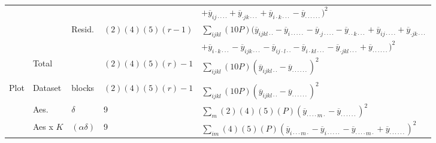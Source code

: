\begin{table}[h]
\begin{tabular}{lllll}
      &&&&\hphantom{$\sum_{ijk} (r)(10P)($}$ + 
                             \overline{y}_{ij\cdot\cdot\cdot\cdot} +
                             \overline{y}_{\cdot jk\cdot\cdot\cdot} + 
                             \overline{y}_{i\cdot k\cdot\cdot\cdot}- 
                             \overline{y}_{\cdot\cdot\cdot\cdot\cdot\cdot})^2$ \\
      \cline{2-5}
      & & \multirow{2}{*}{Resid.} & \multirow{2}{*}{$(2)(4)(5)(r-1)$} & 
      $\sum_{ijkl} (10P)(\overline{y}_{ijkl\cdot\cdot}-
                           \overline{y}_{i\cdot\cdot\cdot\cdot\cdot} -
                           \overline{y}_{\cdot j\cdot\cdot\cdot\cdot} - 
                           \overline{y}_{\cdot\cdot k\cdot\cdot\cdot} + 
                           \overline{y}_{ij\cdot\cdot\cdot\cdot} +
                           \overline{y}_{\cdot jk\cdot\cdot\cdot} $\\
      & & & &
      \hphantom{$\sum_{ijkl} (10P)($}$ + 
                           \overline{y}_{i\cdot k\cdot\cdot\cdot} -
                           \overline{y}_{ijk\cdot\cdot\cdot} -
                           \overline{y}_{ij\cdot l\cdot\cdot} -
                           \overline{y}_{i\cdot kl\cdot\cdot\cdot} - 
                           \overline{y}_{\cdot jkl\cdot\cdot\cdot} +                           
                           \overline{y}_{\cdot\cdot\cdot\cdot\cdot\cdot})^2$ \\
      \cline{2-5}
      & Total & & $(2)(4)(5)(r)-1$ & 
      $\sum_{ijkl} (10P)(\overline{y}_{ijkl\cdot\cdot}-
                           \overline{y}_{\cdot\cdot\cdot\cdot\cdot\cdot})^2$ \\
      \hline\\\hline
\multirow{8}{*}{Plot}
      & Dataset & blocks & $(2)(4)(5)(r)-1$ & 
      $\sum_{ijkl} (10P)(\overline{y}_{ijkl\cdot\cdot}-
                           \overline{y}_{\cdot\cdot\cdot\cdot\cdot\cdot})^2$ \\
      \cline{2-5}
      & Aes. & $\delta$ & 9 & 
      $\sum_{m} (2)(4)(5)(P)(\overline{y}_{\cdot\cdot\cdot\cdot m\cdot}-                        
                             \overline{y}_{\cdot\cdot\cdot\cdot\cdot\cdot})^2$ \\
      \cline{2-5}
      & Aes x $K$ & $(\alpha\delta)$ & 9 & 
      $\sum_{im} (4)(5)(P)(\overline{y}_{i \cdot\cdot\cdot m\cdot}- 
                           \overline{y}_{i \cdot\cdot\cdot\cdot\cdot} - 
                           \overline{y}_{\cdot\cdot\cdot\cdot m\cdot} + 
                           \overline{y}_{\cdot\cdot\cdot\cdot\cdot\cdot})^2$ \\

\end{tabular}
\end{table}
